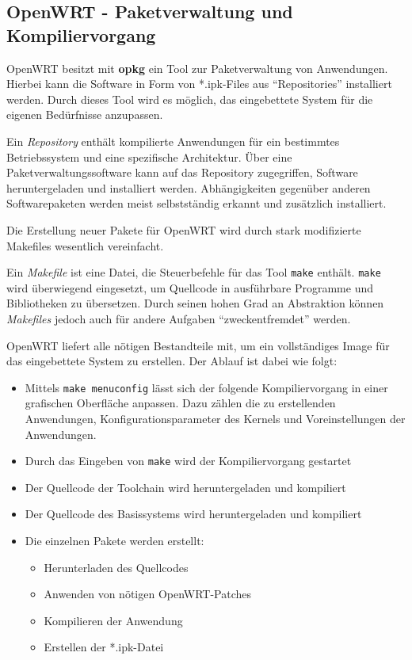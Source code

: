 \subsection{OpenWRT - Paketverwaltung und Kompiliervorgang}
OpenWRT besitzt mit \textbf{opkg} ein Tool zur Paketverwaltung von Anwendungen.
Hierbei kann die Software in Form von *.ipk-Files aus "`Repositories"'
installiert werden. Durch dieses Tool wird es möglich, das eingebettete System
für die eigenen Bedürfnisse anzupassen.
\begin{definition}[Repository]
Ein \emph{Repository} enthält kompilierte Anwendungen für ein bestimmtes
Betriebssystem und eine spezifische Architektur. Über eine
Paketverwaltungssoftware kann auf das Repository zugegriffen, Software
heruntergeladen und installiert werden. Abhängigkeiten gegenüber anderen
Softwarepaketen werden meist selbstständig erkannt und zusätzlich installiert.
\end{definition}
Die Erstellung neuer Pakete für OpenWRT wird durch stark modifizierte Makefiles
wesentlich vereinfacht.
 \begin{definition}[Makefile]
Ein \emph{Makefile} ist eine Datei, die Steuerbefehle für das Tool
\texttt{make} enthält. \texttt{make} wird überwiegend eingesetzt, um Quellcode
in ausführbare Programme und Bibliotheken zu übersetzen. Durch seinen hohen
Grad an Abstraktion können \emph{Makefiles} jedoch auch für andere Aufgaben
"`zweckentfremdet"' werden.
\end{definition}

\begin{minipage}[c]{\textwidth}
OpenWRT liefert alle nötigen Bestandteile mit, um ein vollständiges Image für
das eingebettete System zu erstellen.
Der Ablauf ist dabei wie folgt:
\begin{itemize}
  \item Mittels \texttt{make menuconfig} lässt sich der folgende
  Kompiliervorgang in einer grafischen Oberfläche anpassen. Dazu zählen die zu
  erstellenden Anwendungen, Konfigurationsparameter des Kernels und
  Voreinstellungen der Anwendungen.
  \item Durch das Eingeben von \texttt{make} wird der Kompiliervorgang
  gestartet
  \item Der Quellcode der Toolchain wird heruntergeladen und kompiliert
  \item Der Quellcode des Basissystems wird heruntergeladen und kompiliert
  \item Die einzelnen Pakete werden erstellt:
  \begin{itemize}
    \item Herunterladen des Quellcodes
    \item Anwenden von nötigen OpenWRT-Patches
    \item Kompilieren der Anwendung
    \item Erstellen der *.ipk-Datei
  \end{itemize}
\end{itemize}
\end{minipage}

